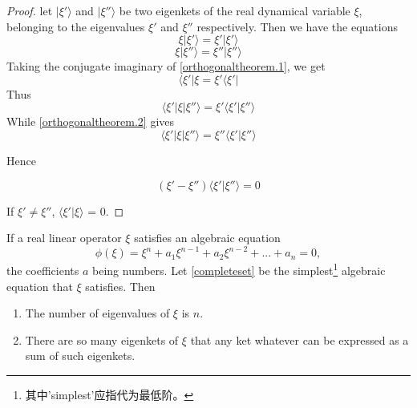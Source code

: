 \begin{proof}
let $|\xi ' \rangle$ and $|\xi '' \rangle$ be two eigenkets of the real dynamical variable $\xi$, belonging to the eigenvalues $\xi '$ and $\xi ''$ respectively. Then we have the equations
\begin{equation}
\xi | \xi ' \rangle = \xi ' |\xi ' \rangle
\label{orthogonaltheorem.1}
\end{equation}
\begin{equation}
\xi | \xi '' \rangle = \xi '' |\xi '' \rangle
\label{orthogonaltheorem.2}
\end{equation}
Taking the conjugate imaginary of \ref{orthogonaltheorem.1}, we get
\begin{equation*}
\langle \xi ' | \xi = \xi ' \langle \xi ' |
\end{equation*}
Thus
\begin{equation*}
\langle \xi ' | \xi | \xi '' \rangle = \xi ' \langle \xi ' | \xi '' \rangle
\end{equation*}
While \ref{orthogonaltheorem.2} gives
\begin{equation*}
\langle \xi ' | \xi | \xi '' \rangle = \xi '' \langle \xi ' | \xi '' \rangle
\end{equation*}

Hence

\begin{equation}
(\xi ' - \xi '') \langle \xi ' | \xi '' \rangle = 0
\end{equation}

If $\xi' \neq \xi ''$, $\langle \xi ' | \xi \rangle$ = $0$.
\end{proof}

\begin{theorem}
If a real linear operator $\xi$ satisfies an algebraic equation
\begin{equation}
\phi (\xi) = \xi ^ n + a_1 \xi ^{n-1} + a_2 \xi ^{n-2} + ... + a_n =0,
\label{completeset}
\end{equation}
the coefficients $a$ being numbers. Let \ref{completeset} be the simplest\footnote{其中'simplest'应指代为最低阶。} algebraic equation that $\xi$ satisfies. Then

\begin{enumerate}
	\item The number of eigenvalues of $\xi$ is $n$.
	\item There are so many eigenkets of $\xi$ that any ket whatever can be expressed as a sum of such eigenkets.
\end{enumerate}
\label{completesettheorem}
\end{theorem}

